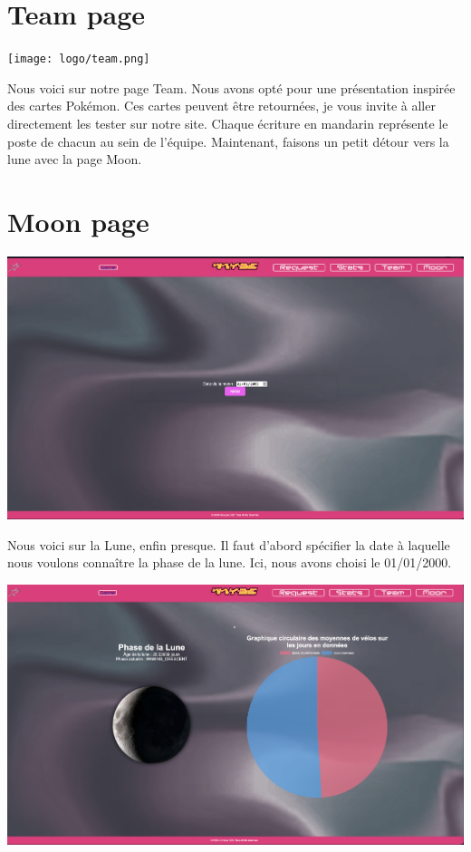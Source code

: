 \documentclass{article}
\begin{document}
\section{Team page}
\begin{center}
    \texttt{[image: logo/team.png]}
\end{center}

Nous voici sur notre page Team. Nous avons opté pour une présentation inspirée des cartes Pokémon. Ces cartes peuvent être retournées, je vous invite à aller directement les tester sur notre site. Chaque écriture en mandarin représente le poste de chacun au sein de l'équipe. Maintenant, faisons un petit détour vers la lune avec la page Moon.


\section{Moon page}
\begin{center}
    \includegraphics[scale=0.3]{logo/MOON1.png}
\end{center}

Nous voici sur la Lune, enfin presque. Il faut d'abord spécifier la date à laquelle nous voulons connaître la phase de la lune. Ici, nous avons choisi le 01/01/2000.

\begin{center}
    \includegraphics[scale=0.3]{logo/MOON2.png}
\end{center}
\end{document}
